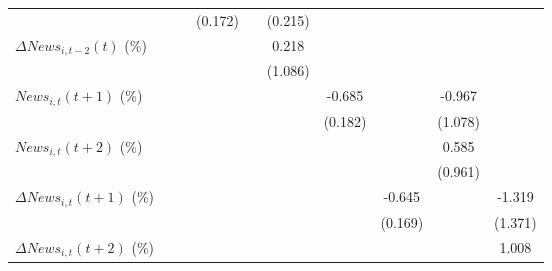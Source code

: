 {\begin{tabular}{l*{9}{c}}
                    &                     &                     &     (0.172)         &                     &     (0.215)         &                     &                     &                     &                     \\
\addlinespace
$ \Delta News_{i,t-2}(t)$ (\%)&                     &                     &                     &                     &       0.218         &                     &                     &                     &                     \\
                    &                     &                     &                     &                     &     (1.086)         &                     &                     &                     &                     \\
\addlinespace
$ News_{i,t}(t+1)$ (\%)&                     &                     &                     &                     &                     &      -0.685\sym{***}&                     &      -0.967         &                     \\
                    &                     &                     &                     &                     &                     &     (0.182)         &                     &     (1.078)         &                     \\
\addlinespace
$ News_{i,t}(t+2)$ (\%)&                     &                     &                     &                     &                     &                     &                     &       0.585         &                     \\
                    &                     &                     &                     &                     &                     &                     &                     &     (0.961)         &                     \\
\addlinespace
$ \Delta News_{i,t}(t+1)$ (\%)&                     &                     &                     &                     &                     &                     &      -0.645\sym{***}&                     &      -1.319         \\
                    &                     &                     &                     &                     &                     &                     &     (0.169)         &                     &     (1.371)         \\
\addlinespace
$ \Delta News_{i,t}(t+2)$ (\%)&                     &                     &                     &                     &                     &                     &                     &                     &       1.008         \\

\end{tabular}}

